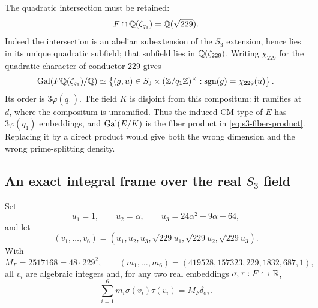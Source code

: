 The quadratic intersection must be retained:
\begin{equation}\label{eq:s3-intersection}
 F\cap\mathbb Q(\zeta_{q_1})=\mathbb Q(\sqrt{229}).
\end{equation}
Indeed the intersection is an abelian subextension of the $S_3$
extension, hence lies in its unique quadratic subfield; that subfield
lies in $\mathbb Q(\zeta_{229})$. Writing $\chi_{229}$ for the quadratic
character of conductor 229 gives
\begin{equation}\label{eq:s3-fiber-product}
 \operatorname{Gal}(F\mathbb Q(\zeta_{q_1})/\mathbb Q)
 \simeq
 \left\{(g,u)\in S_3\times(\mathbb Z/q_1\mathbb Z)^\times:
 \operatorname{sgn}(g)=\chi_{229}(u)\right\}.
\end{equation}
Its order is $3\varphi(q_1)$. The field $K$ is disjoint from this
compositum: it ramifies at $d$, where the compositum is unramified.
Thus the induced CM type of $E$ has $3\varphi(q_1)$ embeddings,
and $\operatorname{Gal}(E/K)$ is the fiber product in
\eqref{eq:s3-fiber-product}. Replacing it by a direct product would
give both the wrong dimension and the wrong prime-splitting density.

\subsection{An exact integral frame over the real $S_3$ field}

\begin{theorem}\label{thm:s3-frame}
Set
\[
 u_1=1,\qquad u_2=\alpha,\qquad
 u_3=24\alpha^2+9\alpha-64,
\]
and let
\[
 (v_1,\ldots,v_6)
 =(u_1,u_2,u_3,\sqrt{229}u_1,\sqrt{229}u_2,\sqrt{229}u_3).
\]
With
\[
 M_F=2517168=48\cdot229^2,
 \qquad
 (m_1,\ldots,m_6)=(419528,157323,229,1832,687,1),
\]
all $v_i$ are algebraic integers and, for any two real embeddings
$\sigma,\tau:F\hookrightarrow\mathbb R$,
\begin{equation}\label{eq:s3-frame}
 \sum_{i=1}^{6}m_i\sigma(v_i)\tau(v_i)
 =M_F\delta_{\sigma\tau}.
\end{equation}
\end{theorem}

